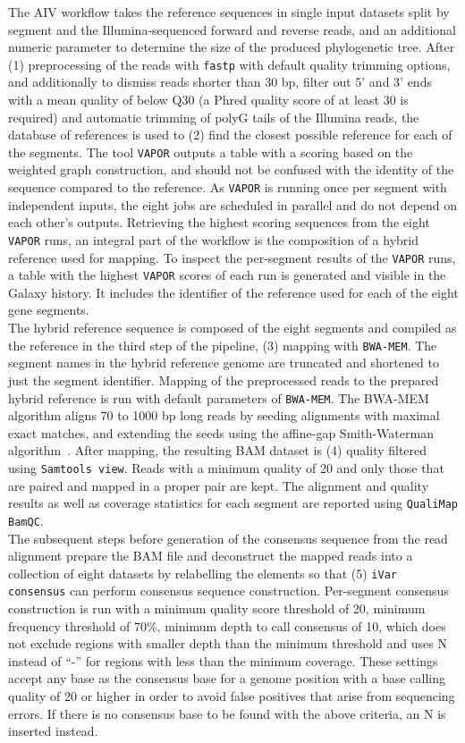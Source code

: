 The \ac{AIV} workflow takes the reference sequences in single input datasets split by segment and the Illumina-sequenced forward and reverse reads, and an additional numeric parameter to determine the size of the produced phylogenetic tree. After (1) preprocessing of the reads with \texttt{fastp} with default quality trimming options, and additionally to dismiss reads shorter than 30 bp, filter out 5' and 3' ends with a mean quality of below Q30 (a Phred quality score of at least 30 is required) and automatic trimming of polyG tails of the Illumina reads, the database of references is used to (2) find the closest possible reference for each of the segments. The tool \texttt{VAPOR} outputs a table with a scoring based on the weighted graph construction, and should not be confused with the identity of the sequence compared to the reference. As \texttt{VAPOR} is running once per segment with independent inputs, the eight jobs are scheduled in parallel and do not depend on each other's outputs. Retrieving the highest scoring sequences from the eight \texttt{VAPOR} runs, an integral part of the workflow is the composition of a hybrid reference used for mapping. To inspect the per-segment results of the \texttt{VAPOR} runs, a table with the highest \texttt{VAPOR} scores of each run is generated and visible in the Galaxy history. It includes the identifier of the reference used for each of the eight gene segments.\\
The hybrid reference sequence is composed of the eight segments and compiled as the reference in the third step of the pipeline, (3) mapping with \texttt{BWA-MEM}. The segment names in the hybrid reference genome are truncated and shortened to just the segment identifier. Mapping of the preprocessed reads to the prepared hybrid reference is run with default parameters of \texttt{BWA-MEM}. The \ac{BWA-MEM} algorithm aligns 70 to 1000 bp long reads by seeding alignments with maximal exact matches, and extending the seeds using the affine-gap Smith-Waterman algorithm~\cite{li2013aligning}. After mapping, the resulting \ac{BAM} dataset is (4) quality filtered using \texttt{Samtools view}. Reads with a minimum quality of 20 and only those that are paired and mapped in a proper pair are kept. The alignment and quality results as well as coverage statistics for each segment are reported using \texttt{QualiMap BamQC}. \\
The subsequent steps before generation of the consensus sequence from the read alignment prepare the \ac{BAM} file and deconstruct the mapped reads into a collection of eight datasets by relabelling the elements so that (5) \texttt{iVar consensus} can perform consensus sequence construction. Per-segment consensus construction is run with a minimum quality score threshold of 20, minimum frequency threshold of 70\%, minimum depth to call consensus of 10, which does not exclude regions with smaller depth than the minimum threshold and uses N instead of ``-'' for regions with less than the minimum coverage. These settings accept any base as the consensus base for a genome position with a base calling quality of 20 or higher in order to avoid false positives that arise from sequencing errors. If there is no consensus base to be found with the above criteria, an N is inserted instead. \\
